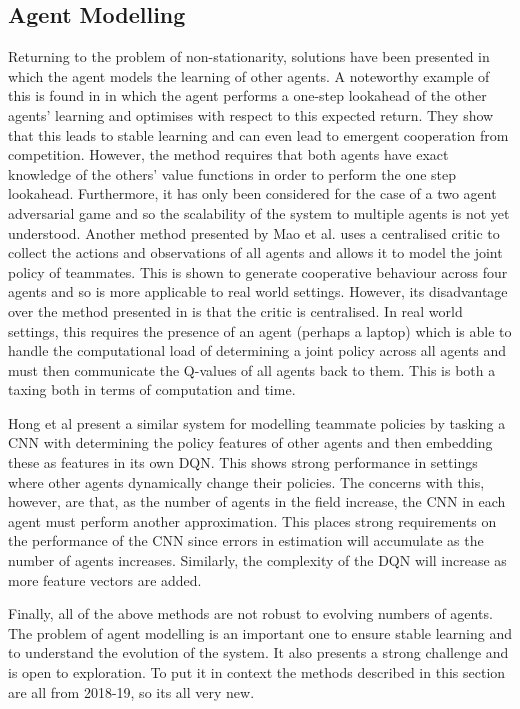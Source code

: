 \documentclass[preprint,11pt]{report}
\begin{document}
\subsection*{Agent Modelling}

Returning to the problem of non-stationarity, solutions have been presented in which the agent
models the learning of other agents. A noteworthy example of this is found in
\cite{Foerster2018LearningAwareness} in which the agent performs a one-step lookahead of the other
agents' learning and optimises with respect to this expected return. They show that this leads to
stable learning and can even lead to emergent cooperation from competition. However, the method
requires that both agents have exact knowledge of the others' value functions in order to perform
the one step lookahead. Furthermore, it has only been considered for the case of a two agent
adversarial game and so the scalability of the system to multiple agents is not yet understood.
Another method presented by Mao et al. \cite{MaoModellingDDPG} uses a centralised critic to collect
the actions and observations of all agents and allows it to model the joint policy of teammates.
This is shown to generate cooperative behaviour across four agents and so is more applicable to real
world settings. However, its disadvantage over the method presented in
\cite{Foerster2018LearningAwareness} is that the critic is centralised. In real world settings, this
requires the presence of an agent (perhaps a laptop) which is able to handle the computational load
of determining a joint policy across all agents and must then communicate the Q-values of all agents
back to them. This is both a taxing both in terms of computation and time. 

Hong et al \cite{Hong2018ASystems} present a similar system for modelling teammate policies by
tasking a CNN with determining the policy features of other agents and then embedding these as
features in its own DQN. This shows strong performance in settings where other agents dynamically
change their policies. The concerns with this, however, are that, as the number of agents in the
field increase, the CNN in each agent must perform another approximation. This places strong
requirements on the performance of the CNN since errors in estimation will accumulate as the number
of agents increases. Similarly, the complexity of the DQN will increase as more feature vectors are
added. 

Finally, all of the above methods are not robust to evolving numbers of agents. The problem of agent
modelling is an important one to ensure stable learning and to understand the evolution of the
system. It also presents a strong challenge and is open to exploration. To put it in context the
methods described in this section are all from 2018-19, so its all very new.
\end{document}
